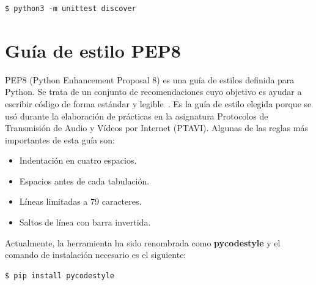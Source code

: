 \documentclass[a4paper, 12pt]{book}
\begin{document}
\begin{lstlisting}[style=consola,numbers=none]
$ python3 -m unittest discover
\end{lstlisting}

\section{Guía de estilo PEP8} 
\label{sec:pep8}

PEP8 (Python Enhancement Proposal 8) es una guía de estilos definida para Python. Se trata de un conjunto de recomendaciones cuyo objetivo es ayudar a escribir código de forma estándar y legible~\cite{pep8Web}. Es la guía de estilo elegida porque se usó durante la elaboración de prácticas en la asignatura Protocolos de Transmisión de Audio y Vídeos por Internet (PTAVI). Algunas de las reglas más importantes de esta guía son:

\begin{itemize}
	\item Indentación en cuatro espacios.
	\item Espacios antes de cada tabulación.
	\item Líneas limitadas a 79 caracteres.
	\item Saltos de línea con barra invertida.
\end{itemize}

Actualmente, la herramienta ha sido renombrada como \textbf{pycodestyle} y el comando de instalación necesario es el siguiente:

\begin{lstlisting}[style=consola,numbers=none]
$ pip install pycodestyle
\end{lstlisting}



\end{document}
